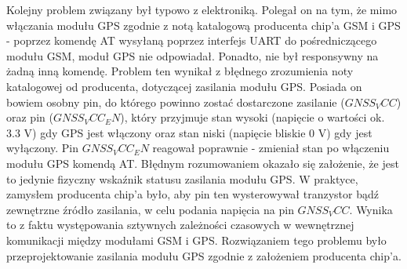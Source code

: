 Kolejny problem związany był typowo z elektroniką. Polegał on na tym, że mimo włączania modułu GPS zgodnie z notą katalogową producenta chip'a GSM i GPS - poprzez komendę AT wysyłaną poprzez interfejs UART do pośredniczącego modułu GSM, moduł GPS nie odpowiadał. Ponadto, nie był responsywny na żadną inną komendę. Problem ten wynikał z błędnego zrozumienia noty katalogowej od producenta, dotyczącej zasilania modułu GPS. Posiada on bowiem osobny pin, do którego powinno zostać dostarczone zasilanie (\textit{$GNSS_VCC$}) oraz pin (\textit{$GNSS_VCC_EN$}), który przyjmuje stan wysoki (napięcie o wartości ok. 3.3 V) gdy GPS jest włączony oraz stan niski (napięcie bliskie 0 V) gdy jest wyłączony. Pin \textit{$GNSS_VCC_EN$} reagował poprawnie - zmieniał stan po włączeniu modułu GPS komendą AT. Błędnym rozumowaniem okazało się założenie, że jest to jedynie fizyczny wskaźnik statusu zasilania modułu GPS. W praktyce, zamysłem producenta chip'a było, aby pin ten wysterowywał tranzystor bądź zewnętrzne źródło zasilania, w celu podania napięcia na pin \textit{$GNSS_VCC$}. Wynika to z faktu występowania sztywnych zależności czasowych w wewnętrznej komunikacji między modułami GSM i GPS. Rozwiązaniem tego problemu było przeprojektowanie zasilania modułu GPS zgodnie z założeniem producenta chip'a.

